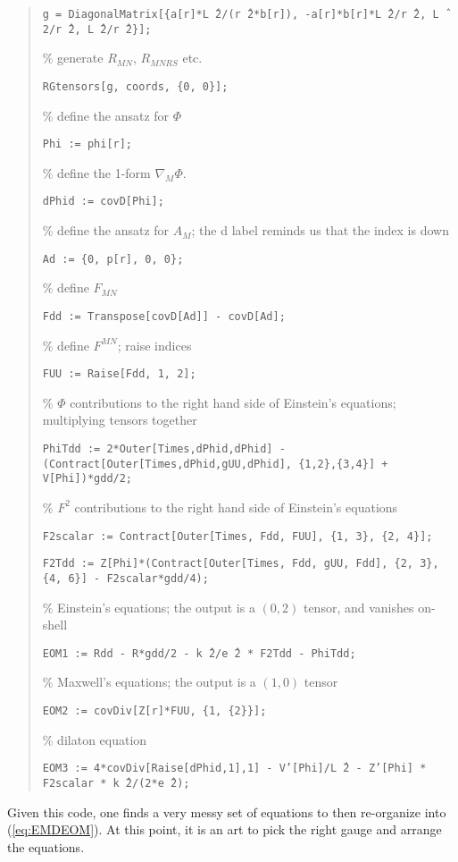 \documentclass[10pt, oneside]{book}
\begin{document}
\begin{doublespace}
\begin{quote}
\texttt{g = DiagonalMatrix[\{a[r]*L\^ \,2/(r\^ \,2*b[r]), -a[r]*b[r]*L\^ \,2/r\^ \,2, L\^ \,2/r\^ \,2, L\^ \,2/r\^ \,2\}];} 

\%  generate $R_{MN}$,  $R_{MNRS}$ etc.

\texttt{RGtensors[g, coords, \{0, 0\}];}  

\%  define the ansatz for $\Phi$

\texttt{Phi := phi[r];}  

\%  define the 1-form $\nabla_M \Phi$.

\texttt{dPhid := covD[Phi];}  

\%  define the ansatz for $A_M$;  the d label reminds us that the index is down

\texttt{Ad := \{0, p[r], 0, 0\};}  

\%  define $F_{MN}$

\texttt{Fdd := Transpose[covD[Ad]] - covD[Ad];}  

\%  define $F^{MN}$; raise indices

\texttt{FUU := Raise[Fdd, 1, 2];}  

\%   $\Phi$ contributions to the right hand side of Einstein's equations;   multiplying tensors together

\texttt{PhiTdd := 2*Outer[Times,dPhid,dPhid] - (Contract[Outer[Times,dPhid,gUU,dPhid], \{1,2\},\{3,4\}] + V[Phi])*gdd/2;}  

\%   $F^2$ contributions to the right hand side of Einstein's equations

\texttt{F2scalar := Contract[Outer[Times, Fdd, FUU], \{1, 3\}, \{2, 4\}];}

\texttt{F2Tdd := Z[Phi]*(Contract[Outer[Times, Fdd, gUU, Fdd], \{2, 3\}, \{4, 6\}] - F2scalar*gdd/4);}  


\%   Einstein's equations; the output is a $(0,2)$ tensor, and vanishes on-shell


\texttt{EOM1 := Rdd - R*gdd/2 - k\^ \,2/e\^ \,2 * F2Tdd - PhiTdd;} 

\%   Maxwell's equations; the output is a $(1,0)$ tensor 

\texttt{EOM2 := covDiv[Z[r]*FUU, \{1, \{2\}\}];}  

\%   dilaton equation

\texttt{EOM3 := 4*covDiv[Raise[dPhid,1],1] - V'[Phi]/L\^ \,2 - Z'[Phi] * F2scalar * k\^ \,2/(2*e\^ \,2);}  
\end{quote}

Given this code, one finds a very messy set of equations to then re-organize into (\ref{eq:EMDEOM}).  At this point, it is an art to pick the right gauge and arrange the equations.   


\end{doublespace}
\end{document}
